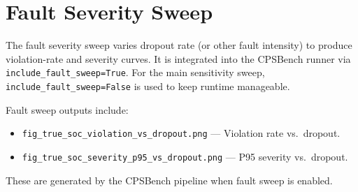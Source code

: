 \section{Fault Severity Sweep}

The fault severity sweep varies dropout rate (or other fault intensity) to produce violation-rate and severity curves. It is integrated into the CPSBench runner via \texttt{include\_fault\_sweep=True}. For the main sensitivity sweep, \texttt{include\_fault\_sweep=False} is used to keep runtime manageable.

Fault sweep outputs include:
\begin{itemize}
\item \texttt{fig\_true\_soc\_violation\_vs\_dropout.png} --- Violation rate vs.\ dropout.
\item \texttt{fig\_true\_soc\_severity\_p95\_vs\_dropout.png} --- P95 severity vs.\ dropout.
\end{itemize}

These are generated by the CPSBench pipeline when fault sweep is enabled.
